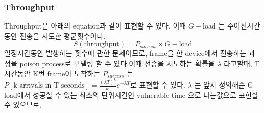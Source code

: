 \subsubsection*{Throughput}
\vspace{-2mm}
Throughput은 아래의 equation과 같이 표현할 수 있다. 이때 $G-\text{load}$ 는 주어진시간동안 전송을 시도한 평균횟수이다. 
$$
S(\text{throughput}) = P_{success} \times G-\text{load}
$$
일정시간동안 발생하는 횟수에 관한 문제이므로, frame을 한 device에서 전송하는 과정을 poison process로 모델링 할 수 있다.이때 전송을 시도하는 확률을 $\lambda$ 라고할때,   T 시간동안 K번 frame이 도착하는 $P_{success}$ 는 $P[\text{k arrivals in T seconds}] = \frac{(\lambda T)^k}{k!} e^{-\lambda T}$로 표현할 수 있다.  $\lambda$ 는 앞서 정의해준 G-load에서 성공할 수 있는 최소의 단위시간인 vulnerable time 으로 나눈값으로  표현할 수 있으므로, 
